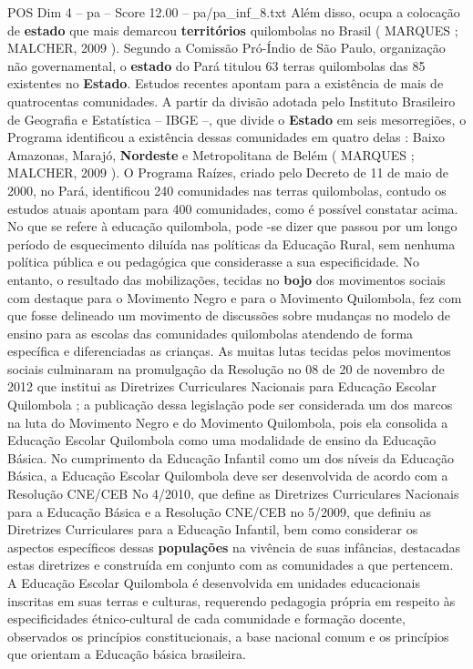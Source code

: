 \begin{textsample}{POS Dim 4 – pa – Score 12.00 – pa/pa\_inf\_8.txt}
Além disso, ocupa a colocação de \textbf{estado} que mais demarcou \textbf{territórios} quilombolas no Brasil ( MARQUES ; MALCHER, 2009 ).
Segundo a Comissão Pró-Índio de São Paulo, organização não governamental, o \textbf{estado} do Pará titulou 63 terras quilombolas das 85 existentes no \textbf{Estado}.
Estudos recentes apontam para a existência de mais de quatrocentas comunidades.
A partir da divisão adotada pelo Instituto Brasileiro de Geografia e Estatística – IBGE –, que divide o \textbf{Estado} em seis mesorregiões, o Programa identificou a existência dessas comunidades em quatro delas : Baixo Amazonas, Marajó, \textbf{Nordeste} e Metropolitana de Belém ( MARQUES ; MALCHER, 2009 ).
O Programa Raízes, criado pelo Decreto de 11 de maio de 2000, no Pará, identificou 240 comunidades nas terras quilombolas, contudo os estudos atuais apontam para 400 comunidades, como é possível constatar acima.
No que se refere à educação quilombola, pode -se dizer que passou por um longo período de esquecimento diluída nas políticas da Educação Rural, sem nenhuma política pública e ou pedagógica que considerasse a sua especificidade.
No entanto, o resultado das mobilizações, tecidas no \textbf{bojo} dos movimentos sociais com destaque para o Movimento Negro e para o Movimento Quilombola, fez com que fosse delineado um movimento de discussões sobre mudanças no modelo de ensino para as escolas das comunidades quilombolas atendendo de forma específica e diferenciadas as crianças.
As muitas lutas tecidas pelos movimentos sociais culminaram na promulgação da Resolução no 08 de 20 de novembro de 2012 que institui as Diretrizes Curriculares Nacionais para Educação Escolar Quilombola ; a publicação dessa legislação pode ser considerada um dos marcos na luta do Movimento Negro e do Movimento Quilombola, pois ela consolida a Educação Escolar Quilombola como uma modalidade de ensino da Educação Básica.
No cumprimento da Educação Infantil como um dos níveis da Educação Básica, a Educação Escolar Quilombola deve ser desenvolvida de acordo com a Resolução CNE/CEB No 4/2010, que define as Diretrizes Curriculares Nacionais para a Educação Básica e a Resolução CNE/CEB no 5/2009, que definiu as Diretrizes Curriculares para a Educação Infantil, bem como considerar os aspectos específicos dessas \textbf{populações} na vivência de suas infâncias, destacadas estas diretrizes e construída em conjunto com as comunidades a que pertencem.
A Educação Escolar Quilombola é desenvolvida em unidades educacionais inscritas em suas terras e culturas, requerendo pedagogia própria em respeito às especificidades étnico-cultural de cada comunidade e formação docente, observados os princípios constitucionais, a base nacional comum e os princípios que orientam a Educação básica brasileira.

\end{textsample}

